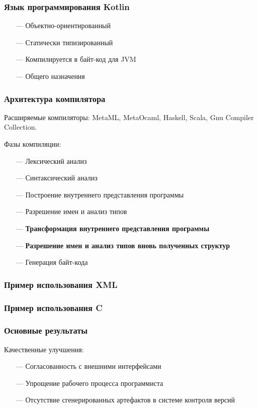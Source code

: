 \documentclass[14pt]{beamer}
\begin{document}
\begin{frame}\frametitle{Язык программирования Kotlin}
    \begin{itemize}
        \item[---] Объектно-ориентированный
        \item[---] Статически типизированный
        \item[---] Компилируется в байт-код для JVM
        \item[---] Общего назначения
    \end{itemize}
\end{frame}

\begin{frame}\frametitle{Архитектура компилятора}
\linespread{0.9}
\begin{small}
    Расширяемые компиляторы: MetaML, MetaOcaml, Haskell, Scala, Gnu Compiler Collection.

    Фазы компиляции:
    \begin{itemize}
        \item[---] Лексический анализ
        \item[---] Синтаксический анализ
        \item[---] Построение внутреннего представления программы
        \item[---] Разрешение имен и анализ типов
        \item[---] \textbf{Трансформация внутреннего представления программы}
        \item[---] \textbf{Разрешение имен и анализ типов вновь полученных структур}
        \item[---] Генерация байт-кода
    \end{itemize}
\end{small}
\linespread{1.2}
\end{frame}

\begin{frame}\frametitle{Пример использования XML}
\end{frame}

\begin{frame}\frametitle{Пример использования C}
\end{frame}

\begin{frame}\frametitle{Основные результаты}
    Качественные улучшения:
    \begin{itemize}
        \item[---] Согласованность с внешними интерфейсами
        \item[---] Упрощение рабочего процесса программиста
        \item[---] Отсутствие сгенерированных артефактов в системе контроля версий
    \end{itemize}
\end{frame}
\end{document}
